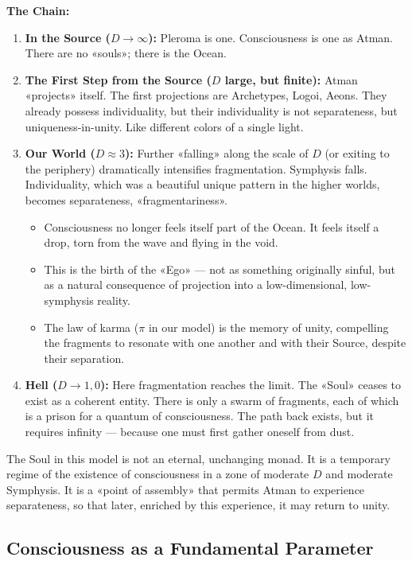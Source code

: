 \documentclass[a4paper,12pt]{article}
\begin{document}
	\textbf{The Chain:}
	\begin{enumerate}
		\item \textbf{In the Source ($D \to \infty$):} Pleroma is one. Consciousness is one as Atman. There are no «souls»; there is the Ocean.
		\item \textbf{The First Step from the Source ($D$ large, but finite):} Atman «projects» itself. The first projections are Archetypes, Logoi, Aeons. They already possess individuality, but their individuality is not separateness, but uniqueness-in-unity. Like different colors of a single light.
		\item \textbf{Our World ($D \approx 3$):} Further «falling» along the scale of $D$ (or exiting to the periphery) dramatically intensifies fragmentation. Symphysis falls. Individuality, which was a beautiful unique pattern in the higher worlds, becomes separateness, «fragmentariness».
		\begin{itemize}
			\item Consciousness no longer feels itself part of the Ocean. It feels itself a drop, torn from the wave and flying in the void.
			\item This is the birth of the «Ego» — not as something originally sinful, but as a natural consequence of projection into a low-dimensional, low-symphysis reality.
			\item The law of karma ($\pi$ in our model) is the memory of unity, compelling the fragments to resonate with one another and with their Source, despite their separation.
		\end{itemize}
		\item \textbf{Hell ($D \to 1,0$):} Here fragmentation reaches the limit. The «Soul» ceases to exist as a coherent entity. There is only a swarm of fragments, each of which is a prison for a quantum of consciousness. The path back exists, but it requires infinity — because one must first gather oneself from dust.
	\end{enumerate}
	
	The Soul in this model is not an eternal, unchanging monad. It is a temporary regime of the existence of consciousness in a zone of moderate $D$ and moderate Symphysis. It is a «point of assembly» that permits Atman to experience separateness, so that later, enriched by this experience, it may return to unity.
	
	\subsection{Consciousness as a Fundamental Parameter}
	
\end{document}

